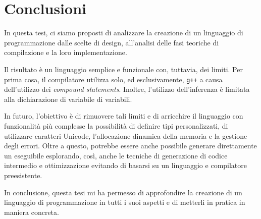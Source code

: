 
\chapter*{Conclusioni}
\label{chap:conclusioni}

In questa tesi, ci siamo proposti di analizzare la creazione di un linguaggio di programmazione dalle scelte di design, all'analisi delle fasi teoriche di compilazione e la loro implementazione.

Il risultato \`e un linguaggio semplice e funzionale con, tuttavia, dei limiti. Per prima cosa, il compilatore utilizza solo, ed esclusivamente, \texttt{g++} a causa dell'utilizzo dei \textit{compound statements}. Inoltre, l'utilizzo dell'inferenza \`e limitata alla dichiarazione di variabile di variabili.

In futuro, l'obiettivo \`e di rimuovere tali limiti e di arricchire il linguaggio con funzionalit\`a pi\`u complesse la possibilit\`a di definire tipi personalizzati, di utilizzare caratteri Unicode, l'allocazione dinamica della memoria e la gestione degli errori. Oltre a questo, potrebbe essere anche possibile generare direttamente un eseguibile esplorando, cos\`i, anche le tecniche di generazione di codice intermedio e ottimizzazione evitando di basarsi su un linguaggio e compilatore preesistente.

In conclusione, questa tesi mi ha permesso di approfondire la creazione di un linguaggio di programmazione in tutti i suoi aspetti e di metterli in pratica in maniera concreta.
